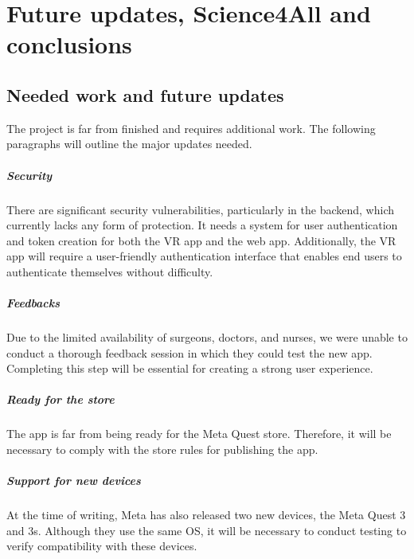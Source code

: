 
\chapter{Future updates, Science4All and conclusions}
\label{chp:conclusions}

\section{Needed work and future updates}
\label{chp:neededWork}
\noindent
The project is far from finished and requires additional work. The following paragraphs will outline the major updates needed.

\paragraph{Security}
There are significant security vulnerabilities, particularly in the backend, which currently lacks any form of protection. It needs a system for user authentication and token creation for both the \ac{VR} app and the web app.
Additionally, the \ac{VR} app will require a user-friendly authentication interface that enables end users to authenticate themselves without difficulty.

\paragraph{Feedbacks}
Due to the limited availability of surgeons, doctors, and nurses, we were unable to conduct a thorough feedback session in which they could test the new app. Completing this step will be essential for creating a strong user experience.

\paragraph{Ready for the store}
The app is far from being ready for the Meta Quest store. Therefore, it will be necessary to comply with the store rules for publishing the app.

\paragraph{Support for new devices}
At the time of writing, Meta has also released two new devices, the Meta Quest 3 and 3s. Although they use the same \ac{OS}, it will be necessary to conduct testing to verify compatibility with these devices.

